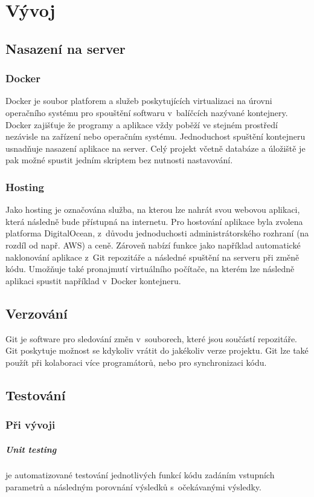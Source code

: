 \documentclass[12pt, a4paper,
  oneside,      %
]{report}
\begin{document}
\chapter{Vývoj}
\section{Nasazení na server}
\subsection{Docker}
Docker je soubor platforem a služeb poskytujících virtualizaci na úrovni operačního systému pro spouštění softwaru v~balíčcích nazývané kontejnery. Docker zajišťuje že programy a aplikace vždy poběží ve stejném prostředí nezávisle na zařízení nebo operačním systému. Jednoduchost spuštění kontejneru usnadňuje nasazení aplikace na server. Celý projekt včetně databáze a úložiště je pak možné spustit jedním skriptem bez nutnosti nastavování.
\subsection{Hosting}
Jako hosting je označována služba, na kterou lze nahrát svou webovou aplikaci, která následně bude přístupná na internetu. Pro hostování aplikace byla zvolena platforma DigitalOcean, z~důvodu jednoduchosti administrátorského rozhraní (na rozdíl od např. AWS) a ceně. Zároveň nabízí funkce jako například automatické naklonování aplikace z~Git repozitáře a následné spuštění na serveru při změně kódu. Umožňuje také pronajmutí virtuálního počítače, na kterém lze následně aplikaci spustit například v~Docker kontejneru.

\section{Verzování}
Git je software pro sledování změn v~souborech, které jsou součástí repozitáře. Git poskytuje možnost se kdykoliv vrátit do jakékoliv verze projektu. Git lze také použít při kolaboraci více programátorů, nebo pro synchronizaci kódu.
\section{Testování}
\subsection{Při vývoji}
\paragraph{Unit testing} je automatizované testování jednotlivých funkcí kódu zadáním vstupních parametrů a následným porovnání výsledků s~očekávanými výsledky.
\end{document}
